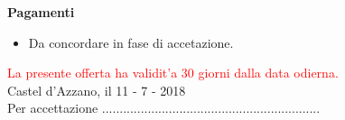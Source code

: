 \documentclass[a4paper]{article}
\begin{document}
                      \noindent\textbf{Pagamenti}
                      \begin{itemize}
                          \item Da concordare in fase di accetazione.
                      \end{itemize}

                      \textcolor{red}{La presente offerta ha validit'a 30 giorni dalla data odierna.}\\

                      Castel d'Azzano, il 11 - 7 - 2018
                      \vspace{1cm}\\
                      Per accettazione ..............................................................

                    
\end{document}
